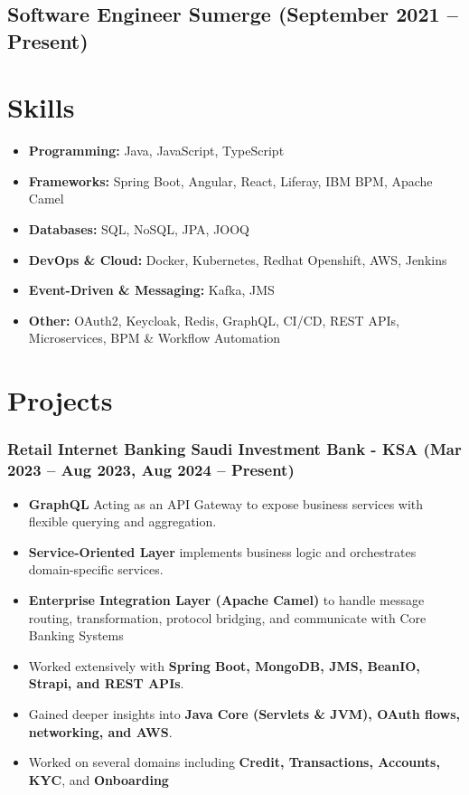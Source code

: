 \documentclass[a4paper,11pt]{article}
\begin{document}
{\subsection*{ Software Engineer \textbar{} Sumerge (September 2021 – Present)}
\section*{{\faStar} Skills}
\begin{itemize}
    \item \textbf{Programming:} Java, JavaScript, TypeScript
    \item \textbf{Frameworks:} Spring Boot, Angular, React, Liferay, IBM BPM, Apache Camel
    \item \textbf{Databases:} SQL, NoSQL, JPA, JOOQ
    \item \textbf{DevOps \& Cloud:} Docker, Kubernetes, Redhat Openshift, AWS, Jenkins
    \item \textbf{Event-Driven \& Messaging:} Kafka, JMS
    \item \textbf{Other:} OAuth2, Keycloak, Redis, GraphQL, CI/CD, REST APIs, Microservices, BPM \& Workflow Automation
\end{itemize}

\section*{{\faPen} Projects}

\subsubsection*{Retail Internet Banking \textbar{} Saudi Investment Bank - KSA (Mar 2023 – Aug 2023, Aug 2024 – Present)}
\begin{itemize}
\item \textbf{GraphQL} Acting as an API Gateway to  expose business services with flexible querying and aggregation.
\item \textbf{Service-Oriented Layer} implements business logic and orchestrates domain-specific services.
\item \textbf{Enterprise Integration Layer (Apache Camel)} to handle message routing, transformation, protocol bridging, and communicate with Core Banking Systems

    \item Worked extensively with \textbf{Spring Boot, MongoDB, JMS, BeanIO, Strapi, and REST APIs}.
    \item Gained deeper insights into \textbf{Java Core (Servlets \& JVM), OAuth flows, networking, and AWS}.
        \item Worked on several domains including \textbf{Credit, Transactions, Accounts, KYC}, and \textbf{Onboarding}
\end{itemize}

}
\end{document}
